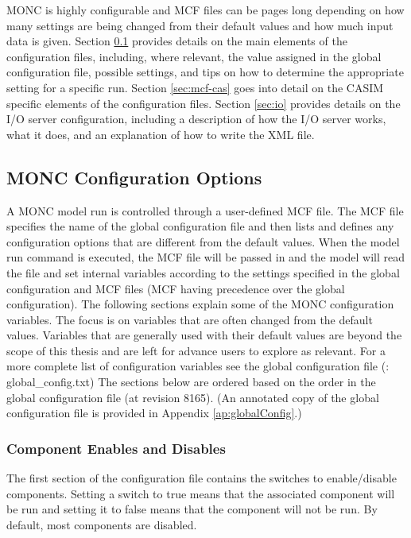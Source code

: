 MONC is highly configurable and MCF files can be pages long depending on how many settings are being changed from their default values and how much input data is given. Section \ref{sec:mcf} provides details on the main elements of the configuration files, including, where relevant, the value assigned in the global configuration file, possible settings, and tips on how to determine the appropriate setting for a specific run. Section \ref{sec:mcf-cas} goes into detail on the CASIM specific elements of the configuration files. Section \ref{sec:io} provides details on the I/O server configuration, including a description of how the I/O server works, what it does, and an explanation of how to write the XML file.

\subsection{MONC Configuration Options} \label{sec:mcf}
A MONC model run is controlled through a user-defined MCF file. The MCF file specifies the name of the global configuration file and then lists and defines any configuration options that are different from the default values. When the model run command is executed, the MCF file will be passed in and the model will read the file and set internal variables according to the settings specified in the global configuration and MCF files (MCF having precedence over the global configuration). The following sections explain some of the MONC configuration variables. The focus is on variables that are often changed from the default values. Variables that are generally used with their default values are beyond the scope of this thesis and are left for advance users to explore as relevant. For a more complete list of configuration variables see the global configuration file (\cite{moncCode}: global\_config.txt) The sections below are ordered based on the order in the global configuration file (at revision 8165). (An annotated copy of the global configuration file is provided in Appendix \ref{ap:globalConfig}.)

\subsubsection{Component Enables and Disables}
The first section of the configuration file contains the switches to enable/disable components. Setting a switch to true means that the associated component will be run and setting it to false means that the component will not be run. By default, most components are disabled. \citep{moncCode}
\newpage
